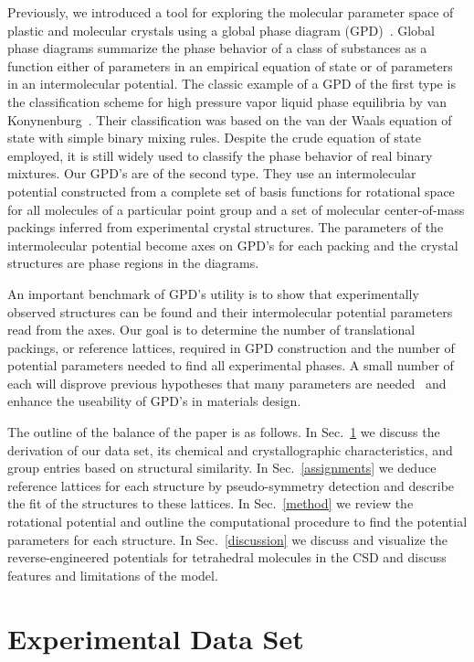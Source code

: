 \documentclass[preprint]{iucr}              %
\begin{document}
Previously, we introduced a tool for exploring the molecular
parameter space of plastic and molecular crystals using a global
phase diagram (GPD)~\cite{Keith04c,Mettes04}. Global phase diagrams
summarize the phase behavior of a class of substances as a function
either of parameters in an empirical equation of state or of
parameters in an intermolecular potential. The classic example of a
GPD of the first type is the classification scheme for high pressure
vapor liquid phase equilibria by van
Konynenburg~\cite{VanKonynenburg80}. Their classification was based
on the van der Waals equation of state with simple binary mixing
rules. Despite the crude equation of state employed, it is still
widely used to classify the phase behavior of real binary mixtures.
Our GPD's are of the second type. They use an intermolecular
potential constructed from a complete set of basis functions for
rotational space for all molecules of a particular point group and a
set of molecular center-of-mass packings inferred from experimental
crystal structures. The parameters of the intermolecular potential
become axes on GPD's for each packing and the crystal structures are
phase regions in the diagrams.

An important benchmark of GPD's utility is to show that
experimentally observed structures can be found and their
intermolecular potential parameters read from the axes. Our goal is
to determine the number of translational packings, or reference
lattices, required in GPD construction and the number of potential
parameters needed to find all experimental phases.  A small number
of each will disprove previous hypotheses that many parameters are
needed~\cite{Briels80} and enhance the useability of GPD's in
materials design.

The outline of the balance of the paper is as follows. In
Sec.~\ref{Reference_Phases} we discuss the derivation of our data
set, its chemical and crystallographic characteristics, and group
entries based on structural similarity. In Sec.~\ref{assignments} we
deduce reference lattices for each structure by pseudo-symmetry
detection and describe the fit of the structures to these lattices.
In Sec.~\ref{method} we review the rotational potential and outline
the computational procedure to find the potential parameters for
each structure. In Sec.~\ref{discussion} we discuss and visualize
the reverse-engineered potentials for tetrahedral molecules in the
CSD and discuss features and limitations of the model.

\section{Experimental Data Set}
\label{Reference_Phases}
\end{document}
